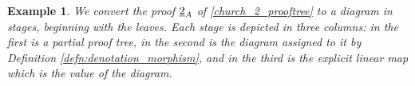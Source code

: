 \documentclass[english,letter paper,12pt,reqno]{article}
\theoremstyle{example}
\newtheorem{example}[theorem]{Example}
\numberwithin{equation}{section}
\begin{document}

\begin{example}\label{example:church_2} We convert the proof $\underline{2}_A$ of \eqref{church_2_prooftree} to a diagram in stages, beginning with the leaves. Each stage is depicted in three columns: in the first is a partial proof tree, in the second is the diagram assigned to it by Definition \ref{defn:denotation_morphism}, and in the third is the explicit linear map which is the value of the diagram. 


\end{example}
\end{document}
